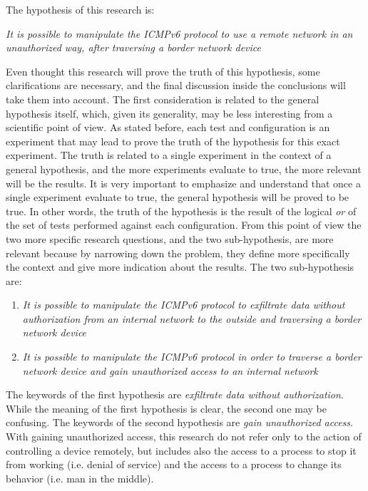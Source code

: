 \documentclass[12pt]{article}
\begin{document}
The hypothesis of this research is:

\textit{It is possible to manipulate the ICMPv6 protocol to use a remote network in an unauthorized way, after traversing a border network device}

Even thought this research will prove the truth of this hypothesis, some clarifications are necessary, and the final discussion inside the conclusions will take them into account. The first consideration is related to the general hypothesis itself, which, given its generality, may be less interesting from a scientific point of view. As stated before, each test and configuration is an experiment that may lead to prove the truth of the hypothesis for this exact experiment. The truth is related to a single experiment in the context of a general hypothesis, and the more experiments evaluate to true, the more relevant will be the results. It is very important to emphasize and understand that once a single experiment evaluate to true, the general hypothesis will be proved to be true. In other words, the truth of the hypothesis is the result of the logical \textit{or} of the set of tests performed against each configuration. From this point of view the two more specific research questions, and the two sub-hypothesis, are more relevant because by narrowing down the problem, they define more specifically the context and give more indication about the results. The two sub-hypothesis are:
\begin{enumerate}[ref=Hypothesis \arabic*]
 \item \label{firstHyp} \textit{It is possible to manipulate the ICMPv6 protocol to exfiltrate data without authorization from an internal network to the outside and traversing a border network device}
 \item \label{secondHyp}\textit{It is possible to manipulate the ICMPv6 protocol in order to traverse a border network device and gain unauthorized access to an internal network}
\end{enumerate}

The keywords of the first hypothesis are \textit{exfiltrate data without authorization}. While the meaning of the first hypothesis is clear, the second one may be confusing. The keywords of the second hypothesis are \textit{gain unauthorized access}. With gaining unauthorized access, this research do not refer only to the action of controlling a device remotely, but includes also the access to a process to stop it from working (i.e. denial of service) and the access to a process to change its behavior (i.e. man in the middle).
\end{document}
